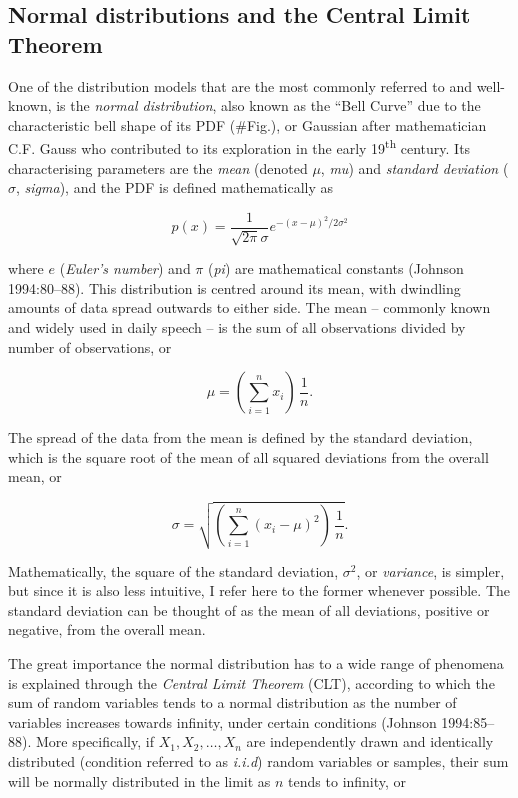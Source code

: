 \documentclass[
  12pt,
]{book}
\begin{document}
\hypertarget{normal-distributions-and-the-central-limit-theorem}{%
\subsection{Normal distributions and the Central Limit Theorem}\label{normal-distributions-and-the-central-limit-theorem}}

One of the distribution models that are the most commonly referred to and well-known, is the \emph{normal distribution}, also known as the ``Bell Curve'' due to the characteristic bell shape of its PDF (\#Fig.), or Gaussian after mathematician C.F. Gauss who contributed to its exploration in the early 19\textsuperscript{th} century. Its characterising parameters are the \emph{mean} (denoted \(\mu\), \emph{mu}) and \emph{standard deviation} (\(\sigma\), \emph{sigma}), and the PDF is defined mathematically as

\begin{equation}
p(x)=\frac{1}{\sqrt{2\pi}\sigma}e^{-(x-\mu)^2/2\sigma^2}
\label{eq:normal}
\end{equation}

where \(e\) (\emph{Euler's number}) and \(\pi\) (\emph{pi}) are mathematical constants (Johnson 1994:80--88). This distribution is centred around its mean, with dwindling amounts of data spread outwards to either side. The mean -- commonly known and widely used in daily speech -- is the sum of all observations divided by number of observations, or

\begin{equation}
\mu = (\sum_{i=1}^nx_i)\,\frac{1}{n}.
\label{eq:mu}
\end{equation}

The spread of the data from the mean is defined by the standard deviation, which is the square root of the mean of all squared deviations from the overall mean, or

\begin{equation}
\sigma = \sqrt{(\sum_{i=1}^n(x_i-\mu)^2)\,\frac{1}{n}}.
\label{eq:sigma}
\end{equation}

Mathematically, the square of the standard deviation, \(\sigma^2\), or \emph{variance}, is simpler, but since it is also less intuitive, I refer here to the former whenever possible. The standard deviation can be thought of as the mean of all deviations, positive or negative, from the overall mean.

The great importance the normal distribution has to a wide range of phenomena is explained through the \emph{Central Limit Theorem} (CLT), according to which the sum of random variables tends to a normal distribution as the number of variables increases towards infinity, under certain conditions (Johnson 1994:85--88). More specifically, if \(X_1, X_2, \dots, X_n\) are independently drawn and identically distributed (condition referred to as \emph{i.i.d}) random variables or samples, their sum will be normally distributed in the limit as \(n\) tends to infinity, or
\end{document}
